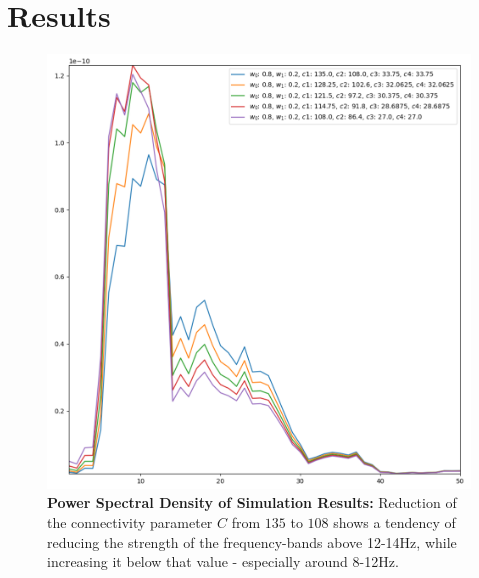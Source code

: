 \chapter{Results}

\begin{figure}[H]
\includegraphics[width=15cm]{Figures/temp_sim_results.png}
\caption{\textbf{Power Spectral Density of Simulation Results:} Reduction of the connectivity parameter $C$ from $135$ to $108$ shows a tendency of reducing the strength of the frequency-bands above 12-14Hz, while increasing it below that value - especially around 8-12Hz.}
\end{figure}

